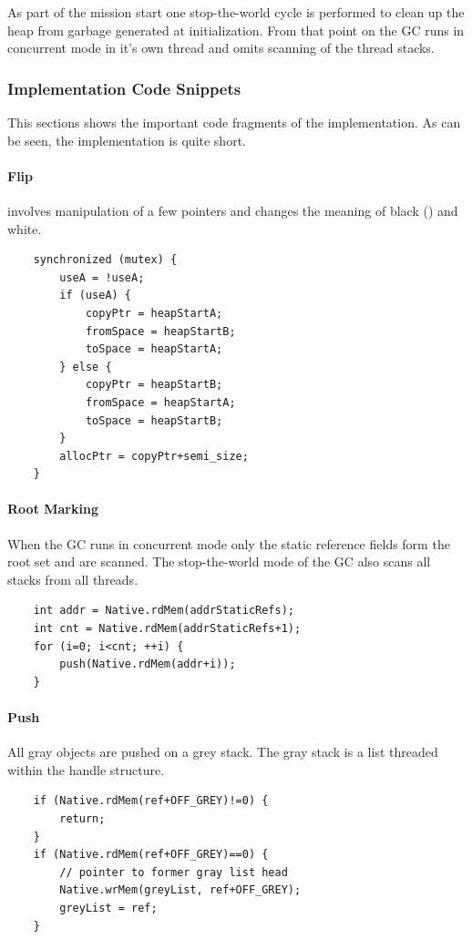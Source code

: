 As part of the mission start one stop-the-world cycle is performed
to clean up the heap from garbage generated at initialization. From
that point on the GC runs in concurrent mode in it's own thread and
omits scanning of the thread stacks.

\subsubsection{Implementation Code Snippets}

This sections shows the important code fragments of the
implementation. As can be seen, the implementation is quite short.

\paragraph{Flip} involves manipulation of a few pointers and changes
the meaning of black () and white.
%
{\small
\begin{verbatim}
    synchronized (mutex) {
        useA = !useA;
        if (useA) {
            copyPtr = heapStartA;
            fromSpace = heapStartB;
            toSpace = heapStartA;
        } else {
            copyPtr = heapStartB;
            fromSpace = heapStartA;
            toSpace = heapStartB;
        }
        allocPtr = copyPtr+semi_size;
    }
\end{verbatim}
}

\paragraph{Root Marking} When the GC runs in concurrent mode only
the static reference fields form the root set and are scanned. The
stop-the-world mode of the GC also scans all stacks from all
threads.
%
{\small
\begin{verbatim}
    int addr = Native.rdMem(addrStaticRefs);
    int cnt = Native.rdMem(addrStaticRefs+1);
    for (i=0; i<cnt; ++i) {
        push(Native.rdMem(addr+i));
    }
\end{verbatim}
}

\paragraph{Push} All gray objects are pushed on a grey stack. The
gray stack is a list threaded within the handle structure.
%
{\small
\begin{verbatim}
    if (Native.rdMem(ref+OFF_GREY)!=0) {
        return;
    }
    if (Native.rdMem(ref+OFF_GREY)==0) {
        // pointer to former gray list head
        Native.wrMem(greyList, ref+OFF_GREY);
        greyList = ref;
    }
\end{verbatim}
}

